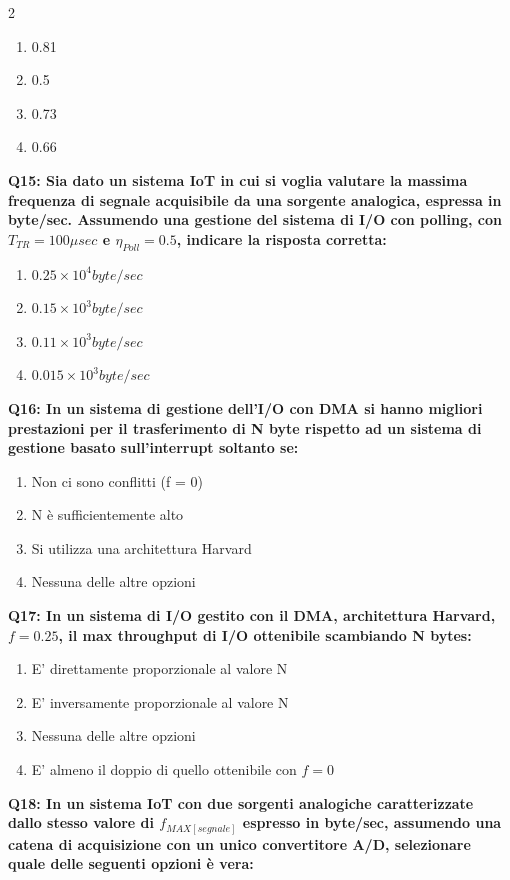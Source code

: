 \documentclass[10pt]{article}
\begin{document}
\begin{multicols}{2}
\begin{enumerate}[label=\arabic*.]
\item 0.81
\item 0.5
\item 0.73
\item 0.66
\end{enumerate}
\textbf{Q15: Sia dato un sistema IoT in cui si voglia valutare la massima frequenza di segnale acquisibile da una sorgente analogica, espressa in byte/sec. Assumendo una gestione del sistema di I/O con polling, con $T_{TR}=100\mu sec$ e $\eta_{Poll}=0.5$, indicare la risposta corretta:}

\begin{enumerate}[label=\arabic*.]
\item $0.25\times10^4 byte/sec$
\item $0.15\times10^3 byte/sec$
\item $0.11\times10^3 byte/sec$
\item $0.015\times10^3 byte/sec$
\end{enumerate}
\textbf{Q16: In un sistema di gestione dell’I/O con DMA si hanno migliori prestazioni per il trasferimento di N byte rispetto ad un sistema di gestione basato sull’interrupt soltanto se:}

\begin{enumerate}[label=\arabic*.]
\item Non ci sono conflitti (f = 0)
\item N è sufficientemente alto
\item Si utilizza una architettura Harvard
\item Nessuna delle altre opzioni
\end{enumerate}
\textbf{Q17: In un sistema di I/O gestito con il DMA, architettura Harvard, $f=0.25$, il max throughput di I/O ottenibile scambiando N bytes:}

\begin{enumerate}[label=\arabic*.]
\item E' direttamente proporzionale al valore N
\item E' inversamente proporzionale al valore N
\item Nessuna delle altre opzioni
\item E' almeno il doppio di quello ottenibile con $f=0$
\end{enumerate}
\textbf{Q18: In un sistema IoT con due sorgenti analogiche caratterizzate dallo stesso valore di $f_{MAX[segnale]}$ espresso in byte/sec, assumendo una catena di acquisizione con un unico convertitore A/D, selezionare quale delle seguenti opzioni è vera:}


\end{multicols}
\end{document}
